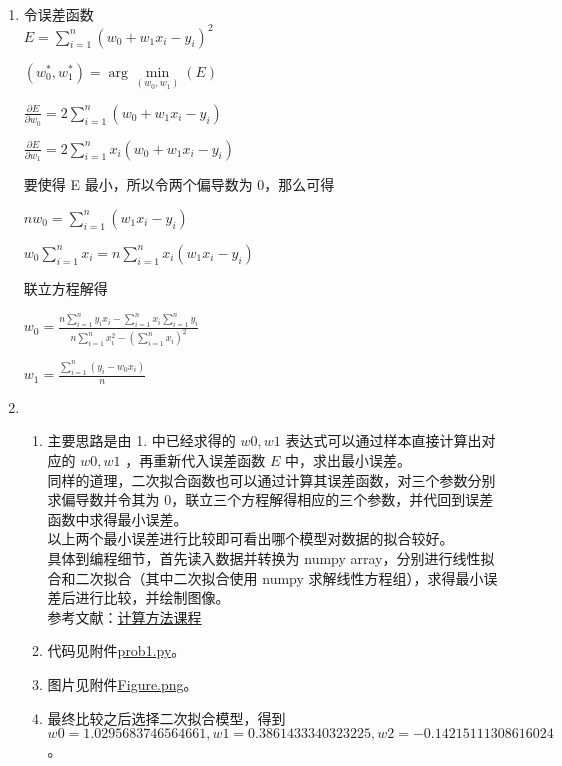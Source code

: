 \begin{solution}
	\heiti
	\ \\
	\begin{enumerate}
		\item 令误差函数\\$E = \sum\limits_{i=1}^n(w_0 + w_1x_i -y_i)^2$
	
		$(w_0^*,w_1^*) = \arg\min\limits_{(w_0,w_1)}(E)$
	
		$\frac{\partial E}{\partial w_0} = 2\sum\limits_{i=1}^n(w_0 + w_1x_i - y_i)$
	
		$\frac{\partial E}{\partial w_1} = 2\sum\limits_{i=1}^nx_i(w_0 + w_1x_i - y_i)$
	
		要使得 E 最小，所以令两个偏导数为 0，那么可得
	
		$nw_0 = \sum\limits_{i=1}^n(w_1x_i-y_i) $
	
		$w_0\sum\limits_{i=1}^nx_i = n\sum\limits_{i=1}^nx_i(w_1x_i-y_i)$
		
		联立方程解得
	
		$ w_0 = \frac{n\sum\limits_{i=1}^ny_ix_i - \sum\limits_{i=1}^nx_i\sum\limits_{i=1}^ny_i}{n\sum\limits_{i=1}^nx_i^2-(\sum\limits_{i=1}^nx_i)^2}$
	
		$ w_1 = \frac{\sum\limits_{i=1}^n(y_i-w_0x_i)}{n}$ 
		\item \ 
			\begin{enumerate}
				\item 主要思路是由 1. 中已经求得的 $w0,w1$ 表达式可以通过样本直接计算出对应的 $w0,w1$ ，再重新代入误差函数 $E$ 中，求出最小误差。\\
				同样的道理，二次拟合函数也可以通过计算其误差函数，对三个参数分别求偏导数并令其为 0，联立三个方程解得相应的三个参数，并代回到误差函数中求得最小误差。\\
				以上两个最小误差进行比较即可看出哪个模型对数据的拟合较好。\\
				具体到编程细节，首先读入数据并转换为 numpy array，分别进行线性拟合和二次拟合（其中二次拟合使用 numpy 求解线性方程组），求得最小误差后进行比较，并绘制图像。\\
				参考文献：\href{https://www.bb.ustc.edu.cn/jpkc/xiaoji/szjsff/jsffkj/chapt3_2.htm}{计算方法课程} 
				\item 代码见附件\href{./prob1.py}{prob1.py}。
				\item 图片见附件\href{./Figure.png}{Figure.png}。
				\item 最终比较之后选择二次拟合模型，得到 $w0 = 1.0295683746564661, w1 = 0.3861433340323225, w2 = -0.14215111308616024$。
			\end{enumerate}
	\end{enumerate}
\end{solution}

